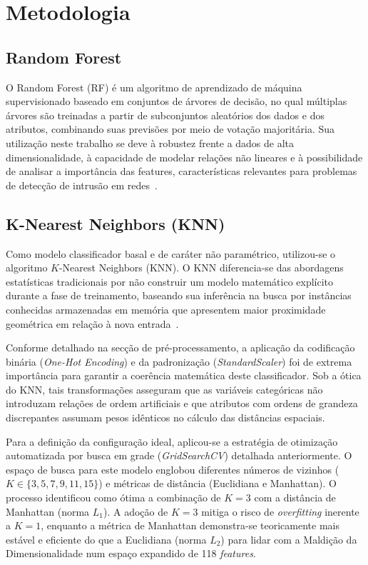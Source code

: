 \section{Metodologia}



\subsection{Random Forest}
O Random Forest (RF) é um algoritmo de aprendizado de máquina supervisionado baseado em
conjuntos de árvores de decisão, no qual múltiplas árvores são treinadas a partir de
subconjuntos aleatórios dos dados e dos atributos, combinando suas previsões por meio de
votação majoritária. Sua utilização neste trabalho se deve à robustez frente a dados de
alta dimensionalidade, à capacidade de modelar relações não lineares e à possibilidade de
analisar a importância das features, características relevantes para problemas de
detecção de intrusão em redes~\cite{breiman_random_forest}.

\subsection{K-Nearest Neighbors (KNN)}
Como modelo classificador basal e de caráter não paramétrico, utilizou-se o algoritmo $K$-Nearest Neighbors 
(KNN). O KNN diferencia-se das abordagens estatísticas tradicionais por não construir um modelo matemático 
explícito durante a fase de treinamento, baseando sua inferência na busca por instâncias conhecidas armazenadas 
em memória que apresentem maior proximidade geométrica em relação à nova entrada~\cite{cover_hart_knn}.

Conforme detalhado na secção de pré-processamento, a aplicação da codificação binária (\textit{One-Hot Encoding}) 
e da padronização (\textit{StandardScaler}) foi de extrema importância para garantir a coerência matemática deste 
classificador. Sob a ótica do KNN, tais transformações asseguram que as variáveis categóricas não introduzam 
relações de ordem artificiais e que atributos com ordens de grandeza discrepantes assumam pesos idênticos no 
cálculo das distâncias espaciais.

Para a definição da configuração ideal, aplicou-se a estratégia de otimização automatizada por busca em grade 
(\textit{GridSearchCV}) detalhada anteriormente. O espaço de busca para este modelo englobou diferentes números 
de vizinhos ($K \in \{3, 5, 7, 9, 11, 15\}$) e métricas de distância (Euclidiana e Manhattan). O processo identificou 
como ótima a combinação de $K=3$ com a distância de Manhattan (norma $L_1$). A adoção de $K=3$ mitiga o risco de 
\textit{overfitting} inerente a $K=1$, enquanto a métrica de Manhattan demonstra-se teoricamente mais estável e eficiente 
do que a Euclidiana (norma $L_2$) para lidar com a Maldição da Dimensionalidade num espaço expandido de 118 \textit{features}.

